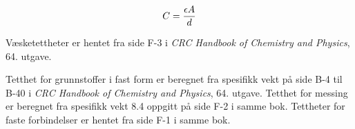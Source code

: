 \vskip 20pt

$$C = {\epsilon A \over d}$$














Væsketettheter er hentet fra side F-3 i {\it CRC Handbook of Chemistry and Physics}, 64. utgave.

\vskip 10pt

Tetthet for grunnstoffer i fast form er beregnet fra spesifikk vekt på side B-4 til B-40 i {\it CRC Handbook of Chemistry and Physics}, 64. utgave. Tetthet for messing er beregnet fra spesifikk vekt 8.4 oppgitt på side F-2 i samme bok. Tettheter for faste forbindelser er hentet fra side F-1 i samme bok.



